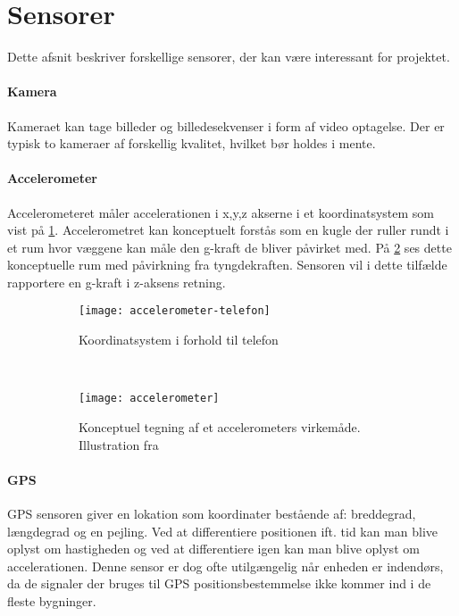 \section{Sensorer}\label{sensorer}
Dette afsnit beskriver forskellige sensorer, der kan være interessant for projektet. 

\paragraph{Kamera}
Kameraet kan tage billeder og billedesekvenser i form af video optagelse.
Der er typisk to kameraer af forskellig kvalitet, hvilket bør holdes i mente.

\paragraph{Accelerometer}
Accelerometeret måler accelerationen i x,y,z akserne i et koordinatsystem som vist på \cref{analyse:accelerometer:koo}.
Accelerometret kan konceptuelt forstås som en kugle der ruller rundt i et rum hvor væggene kan måle den g-kraft de bliver påvirket med.
På \cref{analyse:accelerometer:kraft} ses dette konceptuelle rum med påvirkning fra tyngdekraften. 
Sensoren vil i dette tilfælde rapportere en g-kraft i z-aksens retning.

\begin{figure}[h]
	\centering
	\begin{subfigure}[b]{0.47\textwidth}
		\centering
		\texttt{[image: accelerometer-telefon]}
		\caption{Koordinatsystem i forhold til telefon}
		\label{analyse:accelerometer:koo}
	\end{subfigure}
	~
	\begin{subfigure}[b]{0.47\textwidth}
		\centering
		\texttt{[image: accelerometer]}
		\caption{Konceptuel tegning af et accelerometers virkemåde. Illustration fra \cite{accelerometer}}
		\label{analyse:accelerometer:kraft}
	\end{subfigure}
	\caption{}
	\label{accelerometer}
\end{figure} 

\paragraph{GPS}
GPS sensoren giver en lokation som koordinater bestående af: breddegrad, længdegrad og en pejling.
Ved at differentiere positionen ift. tid kan man blive oplyst om hastigheden og ved at differentiere igen kan man blive oplyst om accelerationen.
Denne sensor er dog ofte utilgængelig når enheden er indendørs, da de signaler der bruges til GPS positionsbestemmelse ikke kommer ind i de fleste bygninger.


